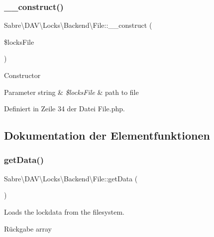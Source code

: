 \subsubsection{\texorpdfstring{\+\_\+\+\_\+construct()}{\_\_construct()}}
{\footnotesize\ttfamily Sabre\textbackslash{}\+D\+A\+V\textbackslash{}\+Locks\textbackslash{}\+Backend\textbackslash{}\+File\+::\+\_\+\+\_\+construct (\begin{DoxyParamCaption}\item[{}]{\$locks\+File }\end{DoxyParamCaption})}

Constructor


\begin{DoxyParams}[1]{Parameter}
string & {\em \$locks\+File} & path to file \\
\hline
\end{DoxyParams}


Definiert in Zeile 34 der Datei File.\+php.



\subsection{Dokumentation der Elementfunktionen}
\mbox{\label{class_sabre_1_1_d_a_v_1_1_locks_1_1_backend_1_1_file_a42651c2f508b49093a9595f377bdb26c}} 
\subsubsection{\texorpdfstring{get\+Data()}{getData()}}
{\footnotesize\ttfamily Sabre\textbackslash{}\+D\+A\+V\textbackslash{}\+Locks\textbackslash{}\+Backend\textbackslash{}\+File\+::get\+Data (\begin{DoxyParamCaption}{ }\end{DoxyParamCaption})\hspace{0.3cm}{\ttfamily [protected]}}

Loads the lockdata from the filesystem.

\begin{DoxyReturn}{Rückgabe}
array 
\end{DoxyReturn}


